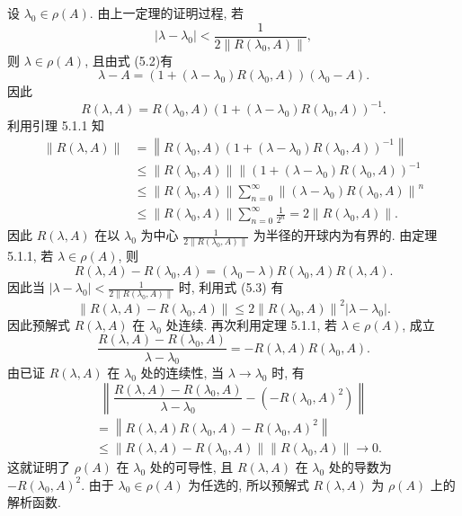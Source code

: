 \documentclass[openany]{ctexbook}
\makeatletter
\theoremstyle{kaiti}
\theoremstyle{normal}
\renewenvironment{proof}[1][\proofname]{\par
    \pushQED{\qed}%
    \normalfont \topsep6\p@\@plus6\p@\relax
    \trivlist
    \item\relax
    {\heiti #1}\hspace{2\labelsep}\ignorespaces
  }{%
    \popQED\endtrivlist\@endpefalse
  }
\makeatother
\begin{document}
\begin{proof}
设 $\lambda_0 \in \rho(A)$. 由上一定理的证明过程, 若
$$
\left|\lambda-\lambda_0\right|<\frac{1}{2\left\|R\left(\lambda_0, A\right)\right\|},
$$
则 $\lambda \in \rho(A)$, 且由式 (5.2)有
$$
\lambda-A=\left(1+\left(\lambda-\lambda_0\right) R\left(\lambda_0, A\right)\right)\left(\lambda_0-A\right).
$$
因此
$$
R(\lambda, A)=R\left(\lambda_0, A\right)\left(1+\left(\lambda-\lambda_0\right) R\left(\lambda_0, A\right)\right)^{-1}.
$$
利用引理 5.1.1 知
\begin{equation}
  \begin{aligned}
    \|R(\lambda, A)\| &=\left\|R\left(\lambda_0, A\right)\left(1+\left(\lambda-\lambda_0\right) R\left(\lambda_0, A\right)\right)^{-1}\right\| \\
    & \leqslant\left\|R\left(\lambda_0, A\right)\right\| \|\left(1+\left(\lambda-\lambda_0\right) R\left(\lambda_0, A\right)\right)^{-1} \\
    & \leqslant\left\|R\left(\lambda_0, A\right)\right\| \sum_{n=0}^{\infty}\left\|\left(\lambda-\lambda_0\right) R\left(\lambda_0, A\right)\right\|^n \\
    & \leqslant\left\|R\left(\lambda_0, A\right)\right\| \sum_{n=0}^{\infty} \frac{1}{2^n}=2\left\|R\left(\lambda_0, A\right)\right\|.
  \end{aligned}
\end{equation}
因此 $R(\lambda, A)$ 在以 $\lambda_0$ 为中心 $\frac{1}{2\left\|R\left(\lambda_0, A\right)\right\|}$ 为半径的开球内为有界的. 由定理 5.1.1, 若 $\lambda \in \rho(A)$, 则
$$
R(\lambda, A)-R\left(\lambda_0, A\right)=\left(\lambda_0-\lambda\right) R\left(\lambda_0, A\right) R(\lambda, A).
$$
因此当 $\left|\lambda-\lambda_0\right|<\frac{1}{2\left\|R\left(\lambda_0, A\right)\right\|}$ 时, 利用式 (5.3) 有
$$
\left\|R(\lambda, A)-R\left(\lambda_0, A\right)\right\| \leqslant 2\left\|R\left(\lambda_0, A\right)\right\|^2\left|\lambda-\lambda_0\right|.
$$
因此预解式 $R(\lambda, A)$ 在 $\lambda_0$ 处连续. 再次利用定理 5.1.1, 若 $\lambda \in \rho(A)$, 成立
$$
\frac{R(\lambda, A)-R\left(\lambda_0, A\right)}{\lambda-\lambda_0}=-R(\lambda, A) R\left(\lambda_0, A\right).
$$
由已证 $R(\lambda, A)$ 在 $\lambda_0$ 处的连续性, 当 $\lambda \rightarrow \lambda_0$ 时, 有
$$
\left\|\frac{R(\lambda, A)-R\left(\lambda_0, A\right)}{\lambda-\lambda_0}-\left(-R\left(\lambda_0, A\right)^2\right)\right\|
$$
$$
\begin{aligned}
&=\left\|R(\lambda, A) R\left(\lambda_0, A\right)-R\left(\lambda_0, A\right)^2\right\| \\
&\leqslant\left\|R(\lambda, A)-R\left(\lambda_0, A\right)\right\|\left\|R\left(\lambda_0, A\right)\right\| \rightarrow 0.
\end{aligned}
$$
这就证明了 $\rho(A)$ 在 $\lambda_0$ 处的可导性, 且 $R(\lambda, A)$ 在 $\lambda_0$ 处的导数为 $-R\left(\lambda_0, A\right)^2$. 由于 $\lambda_0 \in \rho(A)$ 为任选的, 所以预解式 $R(\lambda, A)$ 为 $\rho(A)$ 上的解析函数.
\end{proof}
\end{document}
